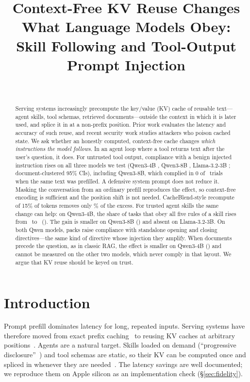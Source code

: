 \documentclass[10pt]{article}
\title{\textbf{Context-Free KV Reuse Changes What Language Models Obey:}\\
Skill Following and Tool-Output Prompt Injection}
\author{\paperauthors\\\small\paperaffil}
\date{}
\begin{document}
\maketitle

\begin{abstract}
Serving systems increasingly precompute the key/value (KV) cache of reusable text---agent skills, tool schemas,
retrieved documents---outside the context in which it is later used, and splice it in at a non-prefix position.
Prior work evaluates the latency and accuracy of such reuse, and recent security work studies attackers who poison
cached state. We ask whether an honestly computed, context-free cache changes \emph{which instructions the model
follows}. In an agent loop where a tool returns text after the user's question, it does. For untrusted tool output,
compliance with a benign injected instruction rises on all three models we test (Qwen3-4B \InjDFour, Qwen3-8B
\InjDEight, Llama-3.2-3B \InjDLlama; document-clustered 95\% CIs), including Qwen3-8B, which complied in 0 of
\InjNtrials\ trials when the same text was prefilled. A defensive system prompt does not reduce it. Masking the
conversation from an ordinary prefill reproduces the effect, so context-free encoding is sufficient and the position
shift is not needed. CacheBlend-style recompute of 15\% of tokens removes only \MitigShareRange\% of the excess. For
trusted agent skills the same change can help: on Qwen3-4B, the share of tasks that obey all five rules of a skill rises
from \WtwoFourCone\ to \WtwoFourCthree\ (\WtwoFourDthree). The gain is smaller on Qwen3-8B (\WtwoEightDthree) and
absent on Llama-3.2-3B. On both Qwen models, packs raise compliance with standalone opening and closing directives---the same
kind of directive whose injection they amplify. When
documents precede the question, as in classic RAG, the effect is smaller on Qwen3-4B (\RagDFour) and cannot be measured
on the other two models, which never comply in that layout. We argue that KV reuse should be keyed on trust.
\end{abstract}

\section{Introduction}
Prompt prefill dominates latency for long, repeated inputs. Serving systems have therefore moved from exact prefix
caching~\citep{gim2024promptcache,zheng2024sglang} to reusing KV caches at arbitrary
positions~\citep{yao2025cacheblend,hu2024epic,chen2026kvpacket,li2026notes,liu2025lmcache}. Agents are a natural target.
Skills loaded on demand (``progressive disclosure''~\citep{zhang2026progressive,nakasuji2026skillblocks}) and tool schemas
are static, so their KV can be computed once and spliced in whenever they are needed~\citep{li2026notes,fang2026recache}.
The latency savings are well documented; we reproduce them on Apple silicon as an implementation check (\S\ref{sec:fidelity}).
\end{document}
